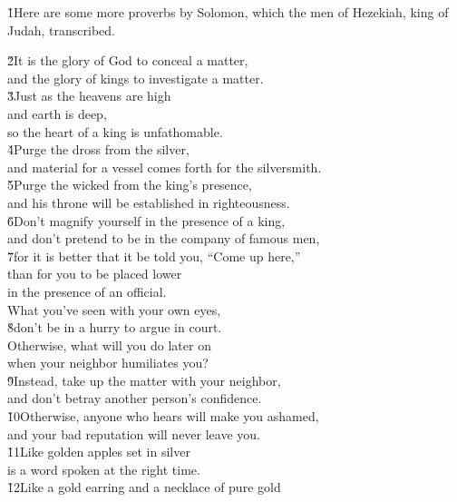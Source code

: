 \v{1}Here are some more proverbs by Solomon, which the men of Hezekiah, king of Judah, transcribed.

\begin{poetry}
\poeml \v{2}It is the glory of God to conceal a matter, \\
\poemll    and the glory of kings to investigate a matter. \\
\poeml \v{3}Just as the heavens are high \\
\poemll    and earth is deep, \\
\poemlll       so the heart of a king is unfathomable. \\
\poeml \v{4}Purge the dross from the silver, \\
\poemll    and material for a vessel comes forth for the silversmith. \\
\poeml \v{5}Purge the wicked from the king's presence, \\
\poemll    and his throne will be established in righteousness. \\
\poeml \v{6}Don't magnify yourself in the presence of a king, \\
\poemll    and don't pretend to be in the company of famous men, \\
\poeml \v{7}for it is better that it be told you, ``Come up here,'' \\
\poemll    than for you to be placed lower \\
\poemlll       in the presence of an official. \\
\poeml What you've seen with your own eyes, \\
\poeml \v{8}don't be in a hurry to argue in court. \\
\poeml Otherwise, what will you do later on \\
\poemll    when your neighbor humiliates you? \\
\poeml \v{9}Instead, take up the matter with your neighbor, \\
\poemll    and don't betray another person's confidence. \\
\poeml \v{10}Otherwise, anyone who hears will make you ashamed, \\
\poemll    and your bad reputation will never leave you. \\
\poeml \v{11}Like golden apples set in silver \\
\poemll    is a word spoken at the right time. \\
\poeml \v{12}Like a gold earring and a necklace of pure gold \\

\end{poetry}
